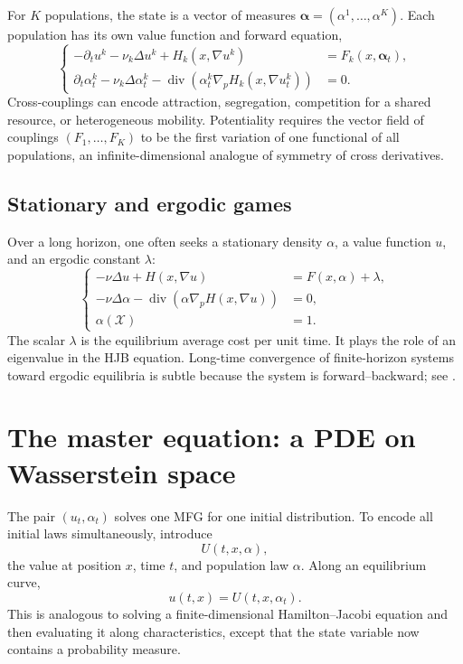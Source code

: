 \documentclass[11pt,a4paper]{article}
\theoremstyle{definition}
\newcommand{\diverg}{\operatorname{div}}
\newcommand{\al}{\alpha}
\begin{document}
For $K$ populations, the state is a vector of measures
$\boldsymbol{\al}=(\al^1,\ldots,\al^K)$.  Each population has its own value
function and forward equation,
\begin{equation}\label{eq:multi-population-mfg}
\left\{
\begin{aligned}
 -\partial_tu^k-\nu_k\Delta u^k
   +H_k(x,\nabla u^k)&=F_k(x,\boldsymbol{\al}_t),\\
 \partial_t\al_t^k-\nu_k\Delta\al_t^k
   -\diverg\!\left(\al_t^k\nabla_pH_k(x,\nabla u_t^k)\right)&=0.
\end{aligned}
\right.
\end{equation}
Cross-couplings can encode attraction, segregation, competition for a shared
resource, or heterogeneous mobility.  Potentiality requires the vector field
of couplings $(F_1,\ldots,F_K)$ to be the first variation of one functional
of all populations, an infinite-dimensional analogue of symmetry of cross
derivatives.

\subsection{Stationary and ergodic games}

Over a long horizon, one often seeks a stationary density $\al$, a value
function $u$, and an ergodic constant $\lambda$:
\begin{equation}\label{eq:stationary-mfg}
\left\{
\begin{aligned}
 -\nu\Delta u+H(x,\nabla u)&=F(x,\al)+\lambda,\\
 -\nu\Delta\al-\diverg\!\left(\al\nabla_pH(x,\nabla u)\right)&=0,\\
 \al(\mathcal X)&=1.
\end{aligned}
\right.
\end{equation}
The scalar $\lambda$ is the equilibrium average cost per unit time.  It plays
the role of an eigenvalue in the HJB equation.  Long-time convergence of
finite-horizon systems toward ergodic equilibria is subtle because the system
is forward--backward; see \citet{CardaliaguetPorretta2019}.

\section{The master equation: a PDE on Wasserstein space}

The pair $(u_t,\al_t)$ solves one MFG for one initial distribution.  To encode
all initial laws simultaneously, introduce
\begin{equation}\label{eq:master-value}
  U(t,x,\al),
\end{equation}
the value at position $x$, time $t$, and population law $\al$.  Along an
equilibrium curve,
\begin{equation}\label{eq:master-characteristic}
  u(t,x)=U(t,x,\al_t).
\end{equation}
This is analogous to solving a finite-dimensional Hamilton--Jacobi equation
and then evaluating it along characteristics, except that the state variable
now contains a probability measure.
\end{document}
